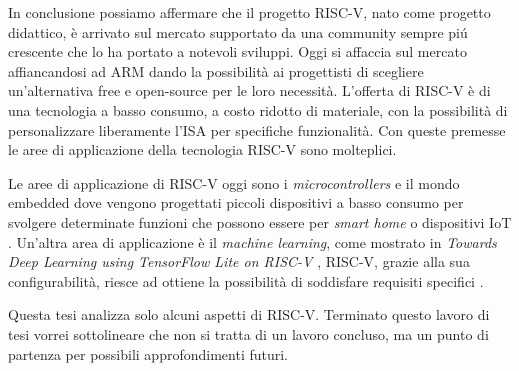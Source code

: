 \documentclass[12pt, a4paper]{report}
\begin{document}
In conclusione possiamo affermare che il progetto RISC-V, nato come progetto didattico, è arrivato sul mercato supportato da una community sempre pi\'u crescente che lo ha portato a notevoli sviluppi. Oggi si affaccia sul mercato affiancandosi ad ARM dando la possibilità ai progettisti di scegliere un'alternativa free e open-source per le loro necessità. L'offerta di RISC-V è di una tecnologia a basso consumo, a costo ridotto di materiale, con la possibilità di personalizzare liberamente l'ISA per specifiche funzionalità. Con queste premesse le aree di applicazione della tecnologia RISC-V sono molteplici. 

Le aree di applicazione di RISC-V oggi sono i \textit{microcontrollers} e il mondo embedded dove vengono progettati piccoli dispositivi a basso consumo per svolgere determinate funzioni che possono essere per \textit{smart home} o dispositivi IoT \cite{ioTRISCV}.
Un'altra area di applicazione è il \textit{machine learning}, come mostrato in \textit{Towards Deep Learning using TensorFlow Lite on RISC-V} \cite{mlRISCV},  RISC-V, grazie alla sua configurabilità, riesce ad ottiene la possibilità di soddisfare requisiti specifici \cite{louis2019towards}.


Questa tesi analizza solo alcuni aspetti di RISC-V. 
Terminato questo lavoro di tesi vorrei sottolineare che non si tratta di un lavoro concluso, ma un punto di partenza per possibili approfondimenti futuri. 




\printbibliography 
\end{document}
